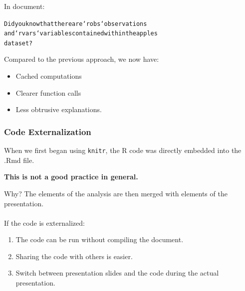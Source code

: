 \documentclass{beamer}\usepackage[]{graphicx}\usepackage[]{color}
\makeatletter
\newenvironment{kframe}{%
 \def\at@end@of@kframe{}%
 \ifinner\ifhmode%
  \def\at@end@of@kframe{\end{minipage}}%
  \begin{minipage}{\columnwidth}%
 \fi\fi%
 \def\FrameCommand##1{\hskip\@totalleftmargin \hskip-\fboxsep
 \colorbox{shadecolor}{##1}\hskip-\fboxsep
     \hskip-\linewidth \hskip-\@totalleftmargin \hskip\columnwidth}%
 \MakeFramed {\advance\hsize-\width
   \@totalleftmargin\z@ \linewidth\hsize
   \@setminipage}}%
 {\par\unskip\endMakeFramed%
 \at@end@of@kframe}
\newenvironment{knitrout}{}{} %
\makeatother
\begin{document}
\begin{frame}[fragile]
\frametitle{}

In document:
\begin{knitrout}
\color{fgcolor}\begin{kframe}
\begin{alltt}
Did you know that there are `r obs` observations 
and `r vars` variables contained within the apples 
data set?
\end{alltt}
\end{kframe}
\end{knitrout}

Compared to the previous approach, we now have:

\begin{itemize}
\item Cached computations
\item Clearer function calls
\item Less obtrusive explanations. 
\end{itemize}

\end{frame}

\begin{frame}[fragile]
\frametitle{Code Externalization}
When we first began using \texttt{knitr}, the R code was directly embedded into the .Rmd file. 
\begin{center}
{\textbf{This is not a good practice in general.} }
\end{center}
Why? The elements of the analysis are then merged with elements of the presentation.
\\$ $\\
If the code is externalized:
\begin{enumerate}
\item The code can be run without compiling the document. 
\item Sharing the code with others is easier.
\item Switch between presentation slides and the code during the actual presentation.
\end{enumerate}
\end{frame}
\end{document}
